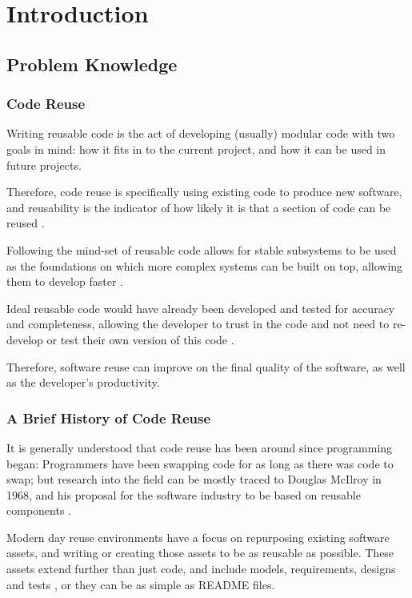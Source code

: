 \chapter{Introduction}

\section{Problem Knowledge}

\subsection{Code Reuse}
Writing reusable code is the act of developing (usually) modular code with two goals in mind: how it fits in to the current project, and how it can be used in future projects.

Therefore, code reuse is specifically using existing code to produce new software, and reusability is the indicator of how likely it is that a section of code can be reused \cite{Frakes2005}.
 
Following the mind-set of reusable code allows for stable subsystems to be used as the foundations on which more complex systems can be built on top, allowing them to develop faster \cite{Yunwen2000}.

Ideal reusable code would have already been developed and tested for accuracy and completeness, allowing the developer to trust in the code and not need to re-develop or test their own version of this code \cite{Grinter2001}.

Therefore, software reuse can improve on the final quality of the software, as well as the developer’s productivity.

\subsection{A Brief History of Code Reuse} \label{codereusehistory}
It is generally understood that code reuse has been around since programming began: Programmers have been swapping code for as long as there was code to swap; but research into the field can be mostly traced to Douglas McIlroy in 1968, and his proposal for the software industry to be based on reusable components \cite{Naur1969,Jacobson1997}.

Modern day reuse environments have a focus on repurposing existing software assets, and writing or creating those assets to be as reusable as possible. 
These assets extend further than just code, and include models, requirements, designs and tests \cite{Grinter2001}, or they can be as simple as README files.

